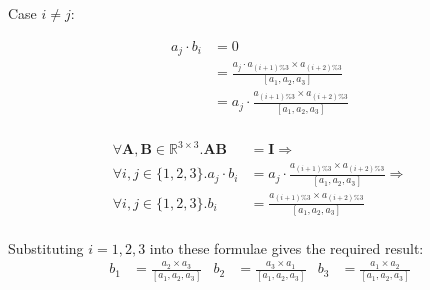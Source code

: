 \documentclass[10pt,oneside,a4paper]{article}
\begin{document}
\begin{enumerate}
Case $i \neq j$:

\[
\begin{split}
a_j \cdot b_i &= 0 \\
              &= \frac{a_j \cdot a_{(i + 1) \% 3} \times a_{(i + 2) \% 3}}{[a_1, a_2, a_3]} \\
              &= a_j \cdot \frac{a_{(i + 1) \% 3} \times a_{(i + 2) \% 3}}{[a_1, a_2, a_3]} \\
\end{split}
\]

\[
\begin{split}
\forall \mathbf{A}, \mathbf{B} \in \mathbb{R}^{3 \times 3}. \mathbf{AB} &= \mathbf{I} \Longrightarrow \\
\forall i, j \in \{1,2,3\}. a_j \cdot b_i &= a_j \cdot \frac{a_{(i + 1)\% 3}\times a_{(i + 2) \% 3}}{[a_1, a_2, a_3]} \Longrightarrow \\
\forall i, j \in \{1, 2, 3\}. b_i &= \frac{a_{(i + 1)\% 3}\times a_{(i + 2) \% 3}}{[a_1, a_2, a_3]} \\
\end{split}
\]

Substituting $i = 1, 2, 3$ into these formulae gives the required result:
\begin{align*}
b_1 &= \frac{a_2 \times a_3}{[a_1, a_2, a_3]} & b_2 &= \frac{a_3 \times a_1}{[a_1, a_2, a_3]} & b_3 &= \frac{a_1 \times a_2}{[a_1, a_2, a_3]}
\end{align*}

\end{enumerate}
\end{document}
